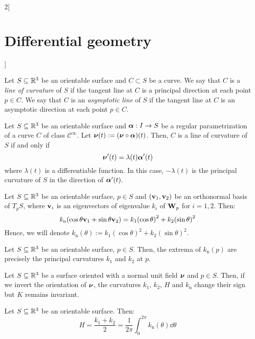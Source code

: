 \documentclass[../../../main.tex]{subfiles}
\begin{document}
\begin{multicols}{2}[\section{Differential geometry}]
\begin{definition}
  \end{definition}
  \begin{definition}
    Let $S\subseteq\mathbb{R}^3$ be an orientable surface and $C\subset S$ be a curve. We say that $C$ is a \emph{line of curvature} of $S$ if the tangent line at $C$ is a principal direction at each point $p\in C$. We say that $C$ is an \emph{asymptotic line} of $S$ if the tangent line at $C$ is an asymptotic direction at each point $p\in C$.
  \end{definition}
  \begin{proposition}
    Let $S\subseteq\mathbb{R}^3$ be an orientable surface and $\boldsymbol{\mathrm{\alpha}}:I\rightarrow S$ be a regular parametrization of a curve $C$ of class $\mathcal{C}^\infty$. Let $\boldsymbol{\mathrm{\nu}}(t):=(\boldsymbol{\mathrm{\nu}}\circ\boldsymbol{\mathrm{\alpha}})(t)$. Then, $C$ is a line of curvature of $S$ if and only if $$\boldsymbol{\mathrm{\nu}}'(t)=\lambda(t)\boldsymbol{\mathrm{\alpha}}'(t)$$ where $\lambda(t)$ is a differentiable function. In this case, $-\lambda(t)$ is the principal curvature of $S$ in the direction of $\boldsymbol{\mathrm{\alpha}}'(t)$.
  \end{proposition}
  \begin{proposition}
    Let $S\subseteq\mathbb{R}^3$ be an orientable surface, $p\in S$ and $(\boldsymbol{\mathrm{v}}_1,\boldsymbol{\mathrm{v}}_2)$ be an orthonormal basis of $T_pS$, where $\boldsymbol{\mathrm{v}}_i$ is an eigenvectors of eigenvalue $k_i$ of $\boldsymbol{\mathrm{W}}_p$ for $i=1,2$. Then: $$k_\text{n}(\cos\theta \boldsymbol{\mathrm{v}}_1+\sin\theta \boldsymbol{\mathrm{v}}_2)=k_1{\left(\cos\theta\right)}^2+k_2{\left(\sin\theta\right)}^2$$
    Hence, we will denote $k_\text{n}(\theta):=k_1{\left(\cos\theta\right)}^2+k_2{\left(\sin\theta\right)}^2$.
  \end{proposition}
  \begin{corollary}
    Let $S\subseteq\mathbb{R}^3$ be an orientable surface, $p\in S$. Then, the extrema of $k_\text{n}(p)$ are precisely the principal curvatures $k_1$ and $k_2$ at $p$.
  \end{corollary}
  \begin{proposition}
    Let $S\subseteq\mathbb{R}^3$ be a surface oriented with a normal unit field $\boldsymbol{\mathrm{\nu}}$ and $p\in S$. Then, if we invert the orientation of $\boldsymbol{\mathrm{\nu}}$, the curvatures $k_1$, $k_2$, $H$ and $k_\text{n}$ change their sign but $K$ remains invariant.
  \end{proposition}
  \begin{proposition}
    Let $S\subseteq\mathbb{R}^3$ be an orientable surface. Then: $$H=\frac{k_1+k_2}{2}=\frac{1}{2\pi}\int_0^{2\pi}k_\text{n}(\theta)\dd\theta$$
  \end{proposition}
  \begin{definition}

\end{definition}
\end{multicols}
\end{document}
